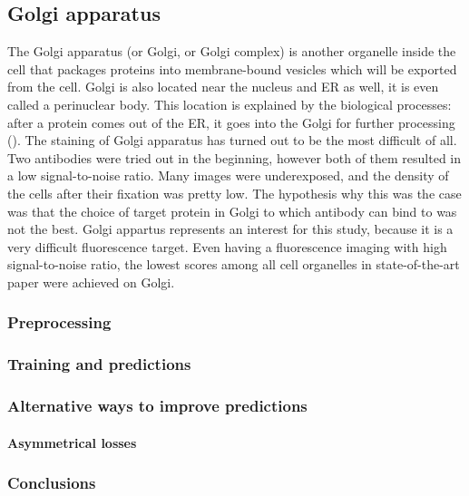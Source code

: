 \subsection{Golgi apparatus}
    The Golgi apparatus (or Golgi, or Golgi complex) is another organelle inside the cell that packages proteins into membrane-bound vesicles which will be exported from the cell. Golgi is also located near the nucleus and ER as well, it is even called a perinuclear body. This location is explained by the biological processes: after a protein comes out of the ER, it goes into the Golgi for further processing (\cite{golgi}). The staining of Golgi apparatus has turned out to be the most difficult of all. Two antibodies were tried out in the beginning, however both of them resulted in a low signal-to-noise ratio. Many images were underexposed, and the density of the cells after their fixation was pretty low. The hypothesis why this was the case was that the choice of target protein in Golgi to which antibody can bind to was not the best. Golgi appartus represents an interest for this study, because it is a very difficult fluorescence target. Even having a fluorescence imaging with high signal-to-noise ratio, the lowest scores among all cell organelles in state-of-the-art paper \cite{Cheng_2021} were achieved on Golgi.
    \subsubsection{Preprocessing}
        
        
    \subsubsection{Training and predictions}
        

    \subsubsection{Alternative ways to improve predictions}
        \paragraph{Asymmetrical losses}
            
    \subsubsection{Conclusions}
        